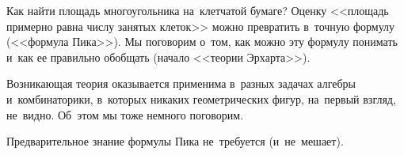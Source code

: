 



Как найти площадь многоугольника на~клетчатой бумаге?
Оценку <<площадь примерно равна числу занятых клеток>> можно превратить
в~точную формулу (<<формула Пика>>).
Мы поговорим о~том, как можно эту формулу понимать и~как ее правильно обобщать
(начало <<теории Эрхарта>>).

Возникающая теория оказывается применима в~разных задачах алгебры
и~комбинаторики, в~которых никаких геометрических фигур, на~первый взгляд,
не~видно.
Об~этом мы тоже немного поговорим.

Предварительное знание формулы Пика не~требуется (и~не~мешает).

